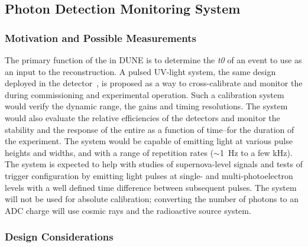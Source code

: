 
\subsection{Photon Detection Monitoring System}

\subsubsection{Motivation and Possible Measurements}
The primary function of the  in DUNE is to determine the \textit{t0} of an %
event %
to use as an input to the \lartpc reconstruction.
A pulsed UV-light system, the same design deployed in the  detector~\cite{Adams:2018lfb}, is proposed as a way to cross-calibrate and monitor the  during commissioning and experimental operation. Such a calibration system would verify the dynamic range, the  %
gains and timing resolutions. The system would also evaluate the relative efficiencies of the detectors and monitor the stability and the response of the entire  as a function of time--for the duration of the experiment. The system would be capable of emitting light at various pulse heights and %
widths, and with a range of repetition rates ($\sim$\SI{1}{\hertz} to %
a few \si{\kilo\hertz}). The system is expected to help with studies of supernova-level signals and tests of trigger configuration by emitting light pulses at single- and multi-photoelectron levels with a well defined time difference between subsequent pulses. The system will not be used for absolute calibration; %
converting the number of photons to an ADC charge will use cosmic rays and the radioactive source system. 

\subsubsection{Design Considerations} 

